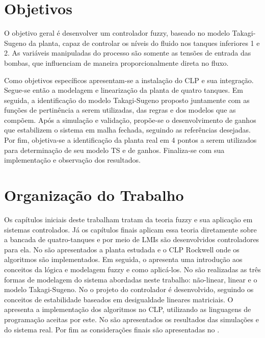 \section{Objetivos}
O objetivo geral é desenvolver um controlador fuzzy, baseado no modelo Takagi-Sugeno da planta, capaz de controlar os níveis do fluido nos tanques inferiores 1 e 2. As variáveis manipuladas do processo são somente as tensões de entrada das bombas, que influenciam de maneira proporcionalmente direta no fluxo.

Como objetivos específicos apresentam-se a instalação do CLP e sua integração. Segue-se então a modelagem e linearização da planta de quatro tanques. Em seguida, a identificação do modelo Takagi-Sugeno proposto juntamente com as funções de pertinência a serem utilizadas, das regras e dos modelos que as compõem. Após a simulação e validação, propõe-se o desenvolvimento de ganhos que estabilizem o sistema em malha fechada, seguindo as referências desejadas. Por fim, objetiva-se a identificação da planta real em 4 pontos a serem utilizados para determinação de seu modelo TS e de ganhos. Finaliza-se com sua implementação e observação dos resultados.

\section{Organização do Trabalho}
Os capítulos iniciais deste trabalham tratam da teoria fuzzy e sua aplicação em sistemas controlados. Já os capítulos finais aplicam essa teoria diretamente sobre a bancada de quatro-tanques e por meio de LMIs são desenvolvidos controladores para ela. No  são apresentados a planta estudada e o CLP Rockwell onde os algoritmos são implementados. Em seguida, o  apresenta uma introdução aos conceitos da lógica e modelagem fuzzy e como aplicá-los. No  são realizadas as três formas de modelagem do sistema abordadas neste trabalho: não-linear, linear e o modelo Takagi-Sugeno. No  o projeto do controlador é desenvolvido, seguindo os conceitos de estabilidade baseados em desigualdade lineares matriciais. O  apresenta a implementação dos algoritmos no CLP, utilizando as linguagens de programação aceitas por este. No  são apresentados os resultados das simulações e do sistema real. Por fim as considerações finais são apresentadas no .

%

